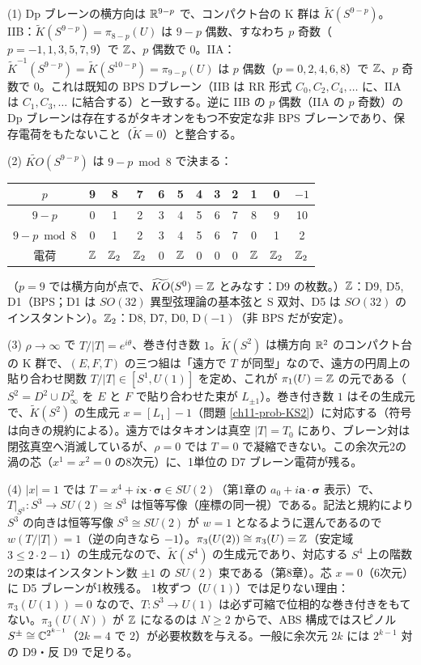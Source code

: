 \begin{solution}
(1) Dp ブレーンの横方向は $\mathbb{R}^{9-p}$ で、コンパクト台の K 群は $\tilde K(S^{9-p})$。IIB：$\tilde K(S^{9-p})=\pi_{8-p}(U)$ は $9-p$ 偶数、すなわち $p$ 奇数（$p=-1,1,3,5,7,9$）で $\mathbb{Z}$、$p$ 偶数で $0$。IIA：$\tilde K^{-1}(S^{9-p})=\tilde K(S^{10-p})=\pi_{9-p}(U)$ は $p$ 偶数（$p=0,2,4,6,8$）で $\mathbb{Z}$、$p$ 奇数で $0$。これは既知の BPS Dブレーン（IIB は RR 形式 $C_0,C_2,C_4,\dots$ に、IIA は $C_1,C_3,\dots$ に結合する）と一致する。逆に IIB の $p$ 偶数（IIA の $p$ 奇数）の Dp ブレーンは存在するがタキオンをもつ不安定な非 BPS ブレーンであり、保存電荷をもたないこと（$\tilde K=0$）と整合する。

(2) $\widetilde{KO}(S^{9-p})$ は $9-p\bmod8$ で決まる：
\begin{center}
\begin{tabular}{c|ccccccccccc}
$p$ & 9 & 8 & 7 & 6 & 5 & 4 & 3 & 2 & 1 & 0 & $-1$\\ \hline
$9-p$ & 0 & 1 & 2 & 3 & 4 & 5 & 6 & 7 & 8 & 9 & 10\\
$9-p\bmod 8$ & 0 & 1 & 2 & 3 & 4 & 5 & 6 & 7 & 0 & 1 & 2\\
電荷 & $\mathbb{Z}$ & $\mathbb{Z}_2$ & $\mathbb{Z}_2$ & 0 & $\mathbb{Z}$ & 0 & 0 & 0 & $\mathbb{Z}$ & $\mathbb{Z}_2$ & $\mathbb{Z}_2$
\end{tabular}
\end{center}
（$p=9$ では横方向が点で、$\widetilde{KO}(S^0)=\mathbb{Z}$ とみなす：D9 の枚数。）$\mathbb{Z}$：D9, D5, D1（BPS；D1 は $SO(32)$ 異型弦理論の基本弦と S 双対、D5 は $SO(32)$ のインスタントン）。$\mathbb{Z}_2$：D8, D7, D0, D$(-1)$（非 BPS だが安定）。

(3) $\rho\to\infty$ で $T/\lvert T\rvert=e^{i\theta}$、巻き付き数 $1$。$\tilde K(S^2)$ は横方向 $\mathbb{R}^2$ のコンパクト台の K 群で、$(E,F,T)$ の三つ組は「遠方で $T$ が同型」なので、遠方の円周上の貼り合わせ関数 $T/\lvert T\rvert\in[S^1,U(1)]$ を定め、これが $\pi_1(U)=\mathbb{Z}$ の元である（$S^2=D^2\cup D^2_\infty$ を $E$ と $F$ で貼り合わせた束が $L_{\pm1}$）。巻き付き数 $1$ はその生成元で、$\tilde K(S^2)$ の生成元 $x=[L_1]-1$（問題 \ref{ch11-prob-KS2}）に対応する（符号は向きの規約による）。遠方ではタキオンは真空 $\lvert T\rvert=T_0$ にあり、ブレーン対は閉弦真空へ消滅しているが、$\rho=0$ では $T=0$ で凝縮できない。この余次元2の渦の芯（$x^1=x^2=0$ の8次元）に、1単位の D7 ブレーン電荷が残る。

(4) $\lvert x\rvert=1$ では $T=x^4+i\bm x\cdot\bm\sigma\in SU(2)$（第1章の $a_0+i\bm a\cdot\bm\sigma$ 表示）で、$T|_{S^3}\colon S^3\to SU(2)\cong S^3$ は恒等写像（座標の同一視）である。記法と規約により $S^3$ の向きは恒等写像 $S^3\cong SU(2)$ が $w=1$ となるように選んであるので $w(T/\lvert T\rvert)=1$（逆の向きなら $-1$）。$\pi_3(U(2))\cong\pi_3(U)=\mathbb{Z}$（安定域 $3\le2\cdot2-1$）の生成元なので、$\tilde K(S^4)$ の生成元であり、対応する $S^4$ 上の階数2の束はインスタントン数 $\pm1$ の $SU(2)$ 束である（第8章）。芯 $x=0$（6次元）に D5 ブレーンが1枚残る。
1枚ずつ（$U(1)$）では足りない理由：$\pi_3(U(1))=0$ なので、$T\colon S^3\to U(1)$ は必ず可縮で位相的な巻き付きをもてない。$\pi_3(U(N))$ が $\mathbb{Z}$ になるのは $N\ge2$ からで、ABS 構成ではスピノル $S^\pm\cong\mathbb{C}^{2^{k-1}}$（$2k=4$ で $2$）が必要枚数を与える。一般に余次元 $2k$ には $2^{k-1}$ 対の D9・反 D9 で足りる。


\end{solution}
